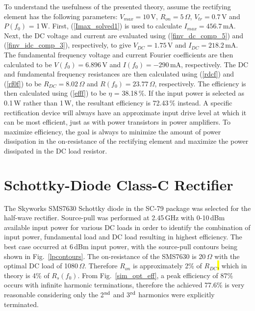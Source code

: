 To understand the usefulness of the presented theory, assume the rectifying element has the following parameters: $V_{max} = 10$\,V, $R_{on} = 5$\,$\Omega$, $V_{tr} = 0.7$\,V and $P(f_0)$ = 1\,W.  First, (\ref{Imax_solved1}) is used to calculate $I_{max}=456.7$\,mA. Next, the DC voltage and current are evaluated using (\ref{finv_dc_comp_5}) and (\ref{finv_idc_comp_3}), respectively, to give $V_{DC}=1.75$\,V and $I_{DC}=218.2$\,mA. The fundamental frequency voltage and current Fourier coefficients are then calculated to be $V(f_0)=6.896$\,V and $I(f_0)=-290$\,mA, respectively.  The DC and fundamental frequency resistances are then calculated using (\ref{rdcf}) and (\ref{rf0f}) to be $R_{DC}=8.02$\,$\Omega$ and $R(f_0)=23.77$\,$\Omega$, respectively.  The efficiency is then calculated using (\ref{efff}) to be $\eta$ = 38.18\,\%. If the input power is selected as 0.1\,W rather than 1\,W, the resultant efficiency is 72.43\,\% instead.  A specific rectification device will always have an approximate input drive level at which it can be most efficient, just as with power transistors in power amplifiers. To maximize efficiency, the goal is always to minimize the amount of power dissipation in the on-resistance of the rectifying element and maximize the power dissipated in the DC load resistor.









\section{Schottky-Diode Class-C Rectifier}

The Skyworks SMS7630 Schottky diode in the SC-79 package was selected for the half-wave rectifier. Source-pull was performed at 2.45\,GHz with 0-10\,dBm available input power for various DC loads in order to identify the combination of input power, fundamental load and DC load resulting in highest efficiency.  The best case occurred at 6\,dBm input power, with the source-pull contours being shown in Fig.~\ref{lpcontours}.  The on-resistance of the SMS7630 is 20\,$\Omega$ with the optimal DC load of 1080\,$\Omega$. Therefore $R_{on}$ is approximately 2\% of $R_{DC}$\hl{,} which in theory is 4\% of $R_s(f_0)$.  From Fig.~\ref{sim_opt_eff}, a peak efficiency of 87\% occurs with infinite harmonic terminations, therefore the achieved 77.6\% is very reasonable considering only the 2$^{\rm nd}$ and 3$^{\rm rd}$ harmonics were explicitly terminated.



